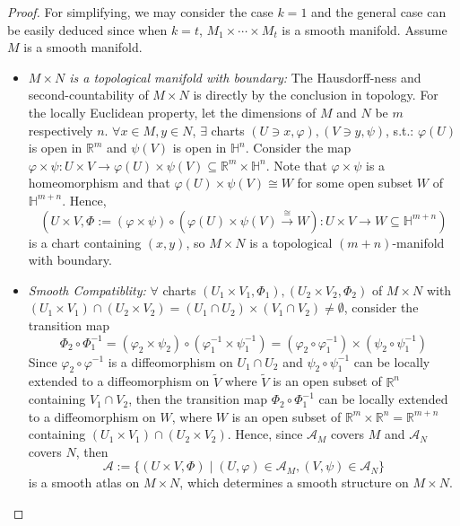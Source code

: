 \begin{proof}
    For simplifying, we may consider the case $k=1$ and the general case can be easily deduced since when $k=t$, $M_1 \times \cdots \times M_t$ is a smooth manifold. Assume $M$ is a smooth manifold.
    \begin{itemize}
        \item \textit{$M\times N$ is a topological manifold with boundary:} The Hausdorff-ness and second-countability of $M\times N$ is directly by the conclusion in topology. For the locally Euclidean property, let the dimensions of $M$ and $N$ be $m$ respectively $n$. $\forall x\in M,y\in N$, $\exists$ charts $(U\ni x, \varphi), (V\ni y,\psi)$, s.t.: $\varphi(U)$ is open in $\mathbb{R}^m$ and $\psi(V)$ is open in $\mathbb{H}^n$. Consider the map $\varphi \times \psi: U\times V\to \varphi(U) \times \psi(V) \subseteq \mathbb{R}^m \times \mathbb{H}^n$. Note that $\varphi \times \psi$ is a homeomorphism and that $\varphi(U) \times \psi(V) \cong W$ for some open subset $W$ of $\mathbb{H}^{m+n}$. Hence,
        \[
        (U\times V, \Phi:= (\varphi \times \psi) \circ (\varphi(U)\times \psi (V) \xrightarrow{\cong} W): U\times V\to W\subseteq \mathbb{H}^{m+n}) 
        \]
        is a chart containing $(x,y)$, so $M\times N$ is a topological $(m+n)$-manifold with boundary.

        \item \textit{Smooth Compatiblity:} $\forall$ charts $(U_1 \times V_1 ,\Phi_1), (U_2\times V_2,\Phi_2)$ of $M\times N$ with $(U_1 \times V_1) \cap (U_2 \times V_2)= (U_1 \cap U_2) \times (V_1 \cap V_2)\neq \emptyset$, consider the transition map
        \[
        \Phi_2 \circ \Phi_1^{-1}= (\varphi_2 \times \psi_2) \circ (\varphi_1^{-1} \times \psi_1^{-1})= (\varphi_2 \circ \varphi_1^{-1}) \times (\psi_2\circ \psi_1^{-1})
        \]
        Since $\varphi_2\circ \varphi^{-1}$ is a diffeomorphism on $U_1\cap U_2$ and $\psi_2 \circ \psi_1^{-1}$ can be locally extended to a diffeomorphism on $\tilde{V}$ where $\tilde{V}$ is an open subset of $\mathbb{R}^n$ containing $V_1\cap V_2$, then the transition map $\Phi_2 \circ \Phi_1^{-1}$ can be locally extended to a diffeomorphism on $W$, where $W$ is an open subset of $\mathbb{R}^m \times \mathbb{R}^n= \mathbb{R}^{m+n}$ containing $(U_1 \times V_1) \cap (U_2\times V_2)$. Hence, since $\mathcal{A}_M$ covers $M$ and $\mathcal{A}_N$ covers $N$, then
        \[
        \mathcal{A}:= \{(U\times V,\Phi) \mid (U,\varphi)\in \mathcal{A}_M, (V,\psi)\in \mathcal{A}_N\}
        \]
        is a smooth atlas on $M\times N$, which determines a smooth structure on $M\times N$.


\end{itemize}
\end{proof}

